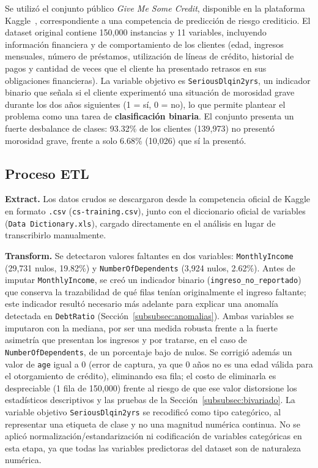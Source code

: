 \documentclass[pdflatex,sn-mathphys-num]{sn-jnl}
\begin{document}
Se utilizó el conjunto público \textit{Give Me Some Credit}, disponible en la plataforma Kaggle~\cite{gmsc}, correspondiente a una competencia de predicción de riesgo crediticio. El dataset original contiene 150{,}000 instancias y 11 variables, incluyendo información financiera y de comportamiento de los clientes (edad, ingresos mensuales, número de préstamos, utilización de líneas de crédito, historial de pagos y cantidad de veces que el cliente ha presentado retrasos en sus obligaciones financieras). La variable objetivo es \texttt{SeriousDlqin2yrs}, un indicador binario que señala si el cliente experimentó una situación de morosidad grave durante los dos años siguientes (1 = sí, 0 = no), lo que permite plantear el problema como una tarea de \textbf{clasificación binaria}. El conjunto presenta un fuerte desbalance de clases: 93.32\% de los clientes (139{,}973) no presentó morosidad grave, frente a solo 6.68\% (10{,}026) que sí la presentó.

\subsection{Proceso ETL}\label{subsec:etl}

\textbf{Extract.} Los datos crudos se descargaron desde la competencia oficial de Kaggle en formato \texttt{.csv} (\texttt{cs-training.csv}), junto con el diccionario oficial de variables (\texttt{Data Dictionary.xls}), cargado directamente en el análisis en lugar de transcribirlo manualmente.

\textbf{Transform.} Se detectaron valores faltantes en dos variables: \texttt{MonthlyIncome} (29{,}731 nulos, 19.82\%) y \texttt{NumberOfDependents} (3{,}924 nulos, 2.62\%). Antes de imputar \texttt{MonthlyIncome}, se creó un indicador binario (\texttt{ingreso\_no\_reportado}) que conserva la trazabilidad de qué filas tenían originalmente el ingreso faltante; este indicador resultó necesario más adelante para explicar una anomalía detectada en \texttt{DebtRatio} (Sección~\ref{subsubsec:anomalias}). Ambas variables se imputaron con la mediana, por ser una medida robusta frente a la fuerte asimetría que presentan los ingresos y por tratarse, en el caso de \texttt{NumberOfDependents}, de un porcentaje bajo de nulos. Se corrigió además un valor de \texttt{age} igual a 0 (error de captura, ya que 0 años no es una edad válida para el otorgamiento de crédito), eliminando esa fila; el costo de eliminarla es despreciable (1 fila de 150{,}000) frente al riesgo de que ese valor distorsione los estadísticos descriptivos y las pruebas de la Sección~\ref{subsubsec:bivariado}. La variable objetivo \texttt{SeriousDlqin2yrs} se recodificó como tipo categórico, al representar una etiqueta de clase y no una magnitud numérica continua. No se aplicó normalización/estandarización ni codificación de variables categóricas en esta etapa, ya que todas las variables predictoras del dataset son de naturaleza numérica.
\end{document}

